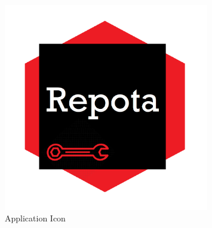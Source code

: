 \begin{figure}[h!]
    \caption{Application Icon} %
    \label{image:repotaChatLogo}
    \centering
    \includegraphics[width=0.8\textwidth]{images/repotaApp_logo.png}
\end{figure}